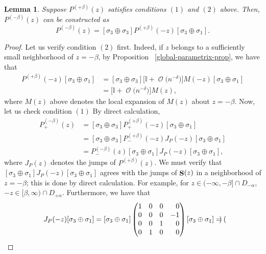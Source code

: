 \documentclass[pdftex]{sigma}
\DeclareMathOperator{\OO}{\mathcal{O}}
\DeclareMathOperator{\boldS}{{\bf S}}
\numberwithin{equation}{section}
\newtheorem{Lemma}[Theorem]{Lemma}
\begin{document}
\begin{Lemma}\label{Parametrix-symmetry-prop}
 Suppose $P^{(+\beta)}(z)$ satisfies conditions $(1)$ and $(2)$ above. Then, $P^{(-\beta)}(z)$ can be constructed as
 \begin{equation*}
 P^{(-\beta)}(z) = [\sigma_3\oplus \sigma_3]P^{(+\beta)}(-z)[\sigma_3 \oplus \sigma_1].
 \end{equation*}
\end{Lemma}
\begin{proof}
 Let us verify condition $(2)$ first. Indeed, if $z$ belongs to a sufficiently small neighborhood of $z = -\beta$, by Proposition
~\ref{global-parametrix-prop}, we have that
 \begin{align*}
 [\sigma_3\oplus \sigma_3]P^{(+\beta)}(-z)[\sigma_3 \oplus \sigma_1] &= [\sigma_3\oplus \sigma_3]\bigl[\mathbb{I} + \OO\bigl(n^{-\delta}\bigr)\bigr] M(-z)[\sigma_3 \oplus \sigma_1]\\
 &=\bigl[\mathbb{I} + \OO\bigl(n^{-\delta}\bigr)\bigr]M(z),
 \end{align*}
 where $M(z)$ above denotes the local expansion of $M(z)$ about $z=-\beta$. Now, let us check condition $(1)$ By direct calculation,
 \begin{align*}
 P^{(-\beta)}_{+}(z) &= [\sigma_3\oplus \sigma_3]P^{(+\beta)}_{+}(-z)[\sigma_3 \oplus \sigma_1]\\
 &= [\sigma_3\oplus \sigma_3]P^{(+\beta)}_{-}(-z) J_{P}(-z)[\sigma_3 \oplus \sigma_1]\\
 &= P^{(-\beta)}_-(z) [\sigma_3 \oplus \sigma_1] J_{P}(-z)[\sigma_3 \oplus \sigma_1],
 \end{align*}
 where $J_P(z)$ denotes the jumps of $P^{(+\beta)}(z)$. We must verify that $[\sigma_3 \oplus \sigma_1]J_{P}(-z)[\sigma_3 \oplus \sigma_1]$ agrees with the
 jumps of $\boldS(z)$ in a neighborhood of $z=-\beta$; this is done by direct calculation. For example, for $z \in (-\infty,-\beta]\cap D_{-\alpha}$,
 $-z \in [\beta,\infty) \cap D_{+\alpha}$. Furthermore, we have that
 \begin{equation*}
 [\sigma_3 \oplus \sigma_1]J_{P}(-z)[\sigma_3 \oplus \sigma_1] = [\sigma_3 \oplus \sigma_1]
 \begin{pmatrix}
 1 & 0 & 0 & \hphantom{-} 0\\
 0 & 0 & 0 & -1\\
 0 & 0 & 1 & \hphantom{-} 0\\
 0 & 1 & 0 & \hphantom{-} 0
 \end{pmatrix}[\sigma_3 \oplus \sigma_1] =
 \begin{pmatrix}

\end{pmatrix}
\end{equation*}
\end{proof}
\end{document}

